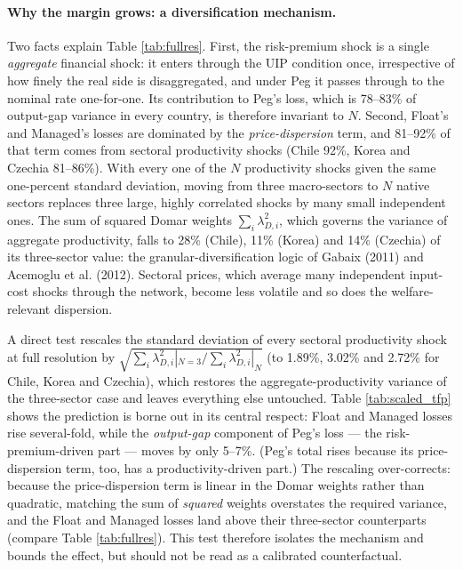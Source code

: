 \documentclass[12pt]{article}
\begin{document}
\paragraph{Why the margin grows: a diversification mechanism.} Two facts explain Table
\ref{tab:fullres}. First, the risk-premium shock is a single \emph{aggregate} financial shock: it
enters through the UIP condition once, irrespective of how finely the real side is disaggregated, and
under Peg it passes through to the nominal rate one-for-one. Its contribution to Peg's loss, which
is 78--83\% of output-gap variance in every country, is therefore invariant to $N$. Second, Float's
and Managed's losses are dominated by the \emph{price-dispersion} term, and 81--92\% of that term
comes from sectoral productivity shocks (Chile 92\%, Korea and Czechia 81--86\%). With every
one of the $N$ productivity shocks given the same one-percent standard deviation, moving from
three macro-sectors to $N$ native sectors replaces three large, highly correlated shocks by many small
independent ones. The sum of squared Domar weights $\sum_i\lambda_{D,i}^2$, which governs the variance
of aggregate productivity, falls to 28\% (Chile), 11\% (Korea) and 14\% (Czechia) of its
three-sector value: the granular-diversification logic of Gabaix (2011) and Acemoglu et al. (2012). Sectoral
prices, which average many independent input-cost shocks through the network, become less volatile
and so does the welfare-relevant dispersion.

A direct test rescales the standard deviation of every sectoral productivity shock at full resolution by
$\sqrt{\sum_i\lambda_{D,i}^2|_{N=3}/\sum_i\lambda_{D,i}^2|_{N}}$ (to 1.89\%, 3.02\% and 2.72\% for
Chile, Korea and Czechia), which restores the aggregate-productivity variance of the three-sector case
and leaves everything else untouched. Table \ref{tab:scaled_tfp} shows the prediction is borne out in
its central respect: Float and Managed losses rise several-fold, while the \emph{output-gap} component
of Peg's loss --- the risk-premium-driven part --- moves by only 5--7\%. (Peg's total rises because its
price-dispersion term, too, has a productivity-driven part.) The rescaling over-corrects: because the
price-dispersion term is linear in the Domar weights rather than quadratic, matching the
sum of \emph{squared} weights overstates the required variance, and the Float and Managed losses land above their
three-sector counterparts (compare Table \ref{tab:fullres}). This test therefore isolates the mechanism
and bounds the effect, but should not be read as a calibrated counterfactual.
\end{document}
